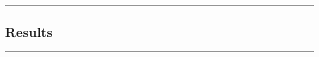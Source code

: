{\color{gray}\hrule}
\begin{center}
\section{Results}
\bigskip
\end{center}
{\color{gray}\hrule}
\begin{multicols}{2}
\lipsum
\end{multicols}
